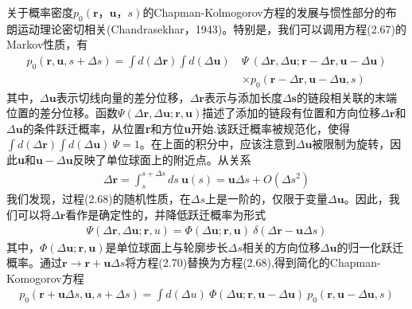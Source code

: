 \documentclass[12pt]{article}
\begin{document}
\begin{CJK}{UTF8}{gkai}
关于概率密度$p_0(\textbf{r}，\textbf{u}，s)$的Chapman-Kolmogorov方程的发展与惯性部分的布朗运动理论密切相关(Chandrasekhar，1943)。特别是，我们可以调用方程(2.67)的Markov性质，有\\
\begin{equation}
\begin{aligned}
p_0(\textbf{r},\textbf{u},s+\Delta s)=\int d(\Delta \textbf{r})\int d(\Delta \textbf{u})\ &\Psi\  (\Delta \textbf{r},\Delta \textbf{u};\textbf{r}-\Delta \textbf{r},\textbf{u}-\Delta \textbf{u})\\ &\times p_0(\textbf{r}-\Delta \textbf{r},\textbf{u}-\Delta \textbf{u},s)
\end{aligned}
\end{equation}
其中，$\Delta\textbf{u}$表示切线向量的差分位移，$\Delta \textbf{r}$表示与添加长度$\Delta \textbf{s}$的链段相关联的末端位置的差分位移。函数$\Psi(\Delta \textbf{r},\Delta \textbf{u};\textbf{r},\textbf{u})$描述了添加的链段有位置和方向位移$\Delta \textbf{r}$和$\Delta \textbf{u}$的条件跃迁概率，从位置\textbf{r}和方位\textbf{u}开始.该跃迁概率被规范化，使得$\int d(\Delta \textbf{r})\int d(\Delta \textbf{u})\ \Psi=1$。在上面的积分中，应该注意到$\Delta\textbf{u}$被限制为旋转，因此\textbf{u}和$\textbf{u}-\Delta \textbf{u}$反映了单位球面上的附近点。从关系\\
\begin{gather}
\Delta \textbf{r} = \int_{s}^{s+\Delta s}ds\ \textbf{u}(s)
= \textbf{u}\Delta s +O(\Delta s ^2)
\end{gather}
我们发现，过程(2.68)的随机性质，在$\Delta s$上是一阶的，仅限于变量$\Delta \textbf{u}$。因此，我们可以将$\Delta \textbf{r}$看作是确定性的，并降低跃迁概率为形式\\
\begin{gather}
\Psi(\Delta \textbf{r} ,\Delta \textbf{u} ;\textbf{r},u)=\Phi(\Delta \textbf{u};\textbf{r},\textbf{u})\ \delta(\Delta \textbf{r}-\textbf{u}\Delta s)
\end{gather}
其中，$\Phi(\Delta \textbf{u};\textbf{r},\textbf{u})$是单位球面上与轮廓步长$\Delta s$相关的方向位移$\Delta \textbf{u}$的归一化跃迁概率。通过$\textbf{r}\longrightarrow \textbf{r}+\textbf{u}\Delta s$将方程(2.70)替换为方程(2.68),得到简化的Chapman-Komogorov方程\\
\begin{gather}
p_0(\textbf{r}+\textbf{u}\Delta s,\textbf{u},s+\Delta s)=\int d (\Delta u)\ \Phi(\Delta \textbf{u} ;\textbf{r},\textbf{u}-\Delta \textbf{u})\ p_0(\textbf{r},\textbf{u}-\Delta \textbf{u},s)
\end{gather}


\end{CJK}
\end{document}
